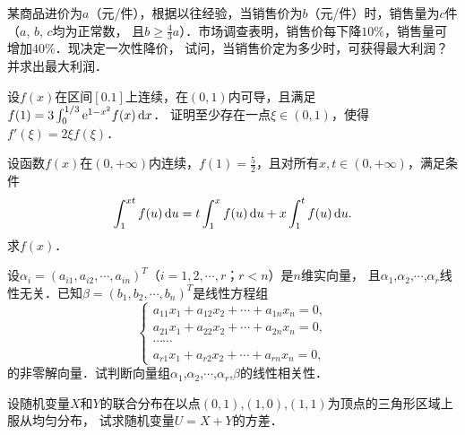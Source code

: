 \documentclass[plain,noanswer,medmath]{../../template/jnuexam}
\begin{document}




\begin{problem}
某商品进价为$a$（元/件），根据以往经验，当销售价为$b$（元/件）时，销售量为$c$件（$a$, $b$, $c$均为正常数，
且$b \ge \frac{4}{3}a$）．市场调查表明，销售价每下降$10\%$，销售量可增加$40\%$．现决定一次性降价，
试问，当销售价定为多少时，可获得最大利润？并求出最大利润．
\end{problem}



\begin{problem}
设$f(x)$在区间$[0.1]$上连续，在$(0,1)$内可导，且满足$f(1) = 3\int_0^{1/3} \mathrm{e}^{1 - x^2} f(x)\mathop{}\!\mathrm{d} x $．
证明至少存在一点$\xi \in(0,1)$，使得$f'(\xi) = 2\xi f(\xi)$．
\end{problem}



\begin{problem}
设函数$f(x)$在$(0, +\infty)$内连续，$f(1) = \frac{5}{2}$，且对所有$x,t \in(0, +\infty)$，满足条件
$$\int_1^{xt} f(u)\mathop{}\!\mathrm{d} u = t\int_1^x f(u)\mathop{}\!\mathrm{d} u + x\int_1^t f(u)\mathop{}\!\mathrm{d} u .$$
求$f(x)$．
\end{problem}






\begin{problem}
设$\alpha_i = (a_{i1},a_{i2}, \cdots ,a_{in})^T$（$i = 1,2, \cdots ,r$；$r < n$）是$n$维实向量，
且$\alpha_1$,$\alpha_2$,$\cdots$,$\alpha_r$线性无关．已知$\beta = (b_1,b_2, \cdots ,b_n)^T$是线性方程组
$$\begin{cases}
  a_{11}x_1 + a_{12}x_2 + \cdots + a_{1n}x_n = 0, \\
  a_{21}x_1 + a_{22}x_2 + \cdots + a_{2n}x_n = 0, \\
  \cdots \cdots \\
  a_{r1}x_1 + a_{r2}x_2 + \cdots + a_{rn}x_n = 0,
\end{cases}$$
的非零解向量．试判断向量组$\alpha_1$,$\alpha_2$,$\cdots$,$\alpha_r$,$\beta$的线性相关性．
\end{problem}






\begin{problem}
设随机变量$X$和$Y$的联合分布在以点$(0,1)$,$(1,0)$,$(1,1)$为顶点的三角形区域上服从均匀分布，
试求随机变量$U = X + Y$的方差．
\end{problem}
\end{document}
